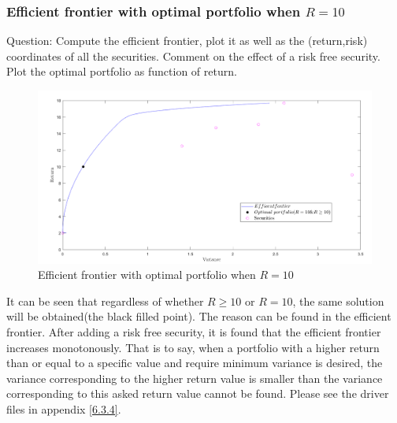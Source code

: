 \subsubsection{\bfseries Efficient frontier with optimal
portfolio when $R=10$}
\begin{shaded}
{ Question: Compute the efficient frontier, plot it as well as the (return,risk) coordinates of all the securities. Comment on the effect of a risk free security. Plot the optimal portfolio as function of return.}
\end{shaded}
\begin{figure}[H]
\centering
\includegraphics[scale=0.5]{figures/eff_fro2.PNG}
\caption{Efficient frontier with optimal
portfolio when $R=10$}
\label{fig:labe3.2.2}
\end{figure}
It can be seen that regardless of whether $R \ge 10$ or $R=10$, the same solution will be obtained(the black filled point). The reason can be found in the efficient frontier. After adding a risk free security, it is found that the efficient frontier increases monotonously. That is to say, when a portfolio with a higher return than or equal to a specific value and require minimum variance is desired, the variance corresponding to the higher return value is smaller than the variance corresponding to this asked return value cannot be found. Please see the driver files in appendix \ref{6.3.4}.



